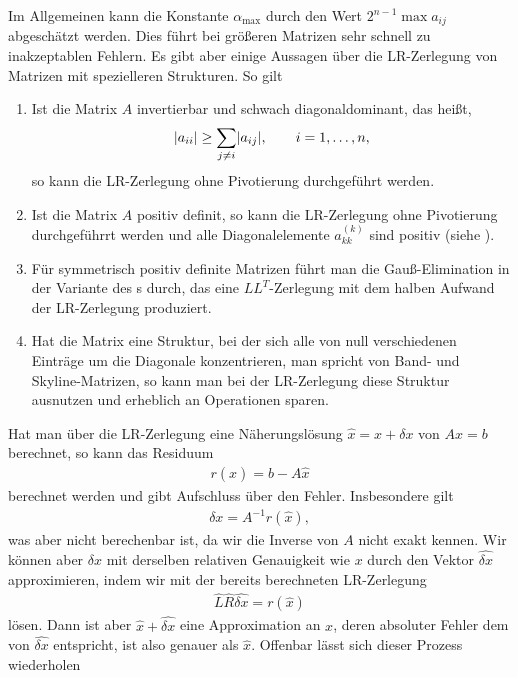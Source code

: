 \begin{remark}
  Im Allgemeinen kann die Konstante $\alpha_{\max}$ durch den Wert
  $2^{n-1} \max a_{ij}$ abgeschätzt werden. Dies führt bei
  größeren Matrizen sehr schnell zu inakzeptablen Fehlern.
  Es gibt aber einige Aussagen über die LR-Zerlegung von Matrizen mit
  spezielleren Strukturen. So gilt
  \begin{enumerate}
  \item Ist die Matrix $A$ invertierbar und schwach diagonaldominant,
    das heißt,
    \begin{gather}
      \lvert a_{ii}\rvert \ge \sum_{j\neq i} \lvert a_{ij}\rvert,
      \qquad i=1,\dots,n,
    \end{gather}
    so kann die LR-Zerlegung ohne Pivotierung durchgeführt werden.
  \item Ist die Matrix $A$ positiv definit, so kann die LR-Zerlegung
    ohne Pivotierung durchgeführrt werden und alle Diagonalelemente
    $a_{kk}^{(k)}$ sind positiv (siehe \cite[Satz 4.7]{Rannacher17}).
  \item Für symmetrisch positiv definite Matrizen führt man die
    Gauß-Elimination in der Variante des
    s durch, das eine $LL^T$-Zerlegung
    mit dem halben Aufwand der LR-Zerlegung produziert.
  \item Hat die Matrix eine Struktur, bei der sich alle von null
    verschiedenen Einträge um die Diagonale konzentrieren, man spricht
    von Band- und Skyline-Matrizen, so kann man bei der LR-Zerlegung
    diese Struktur ausnutzen und erheblich an Operationen sparen.
  \end{enumerate}
\end{remark}

\begin{remark}
  Hat man über die LR-Zerlegung eine Näherungslösung
  $\widehat x = x+\delta x$ von $Ax=b$ berechnet, so kann das Residuum
  \begin{gather}
    r(\widehat x) = b-A \widehat x
  \end{gather}
  berechnet werden und gibt Aufschluss über den Fehler. Insbesondere gilt
  \begin{gather}
    \delta x = A^{-1} r(\widehat x),
  \end{gather}
  was aber nicht berechenbar ist, da wir die Inverse von $A$ nicht
  exakt kennen. Wir können aber $\delta x$ mit derselben relativen
  Genauigkeit wie $x$ durch den Vektor $\widehat{\delta x}$ approximieren, indem
  wir mit der bereits berechneten LR-Zerlegung
  \begin{gather}
    \widehat L \widehat R \widehat{\delta x} = r(\widehat x)
  \end{gather}
  lösen. Dann ist aber $\widehat x + \widehat{\delta x}$ eine
  Approximation an $x$, deren absoluter Fehler dem von
  $\widehat{\delta x}$ entspricht, ist also genauer als $\widehat x$.
  Offenbar lässt sich dieser Prozess wiederholen
\end{remark}

